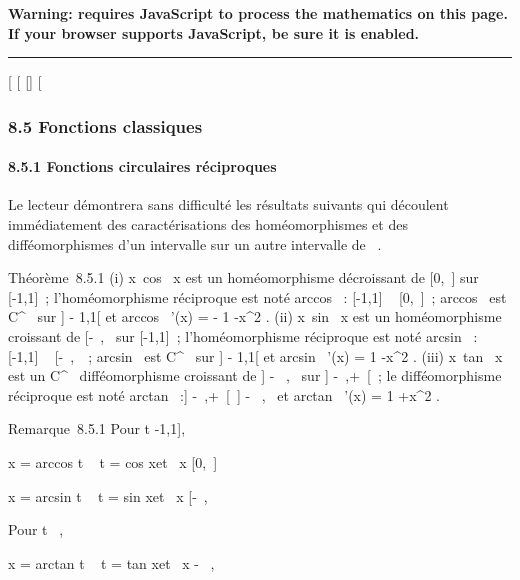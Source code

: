 \textbf{Warning: 
requires JavaScript to process the mathematics on this page.\\ If your
browser supports JavaScript, be sure it is enabled.}

\begin{center}\rule{3in}{0.4pt}\end{center}

{[}
{[}
{[}{]}
{[}

\subsubsection{8.5 Fonctions classiques}

\paragraph{8.5.1 Fonctions circulaires réciproques}

Le lecteur démontrera sans difficulté les résultats suivants qui
découlent immédiatement des caractérisations des homéomorphismes et des
difféomorphismes d'un intervalle sur un autre intervalle de ~.

Théorème~8.5.1 (i)
x\mapsto~cos~ x est un
homéomorphisme décroissant de {[}0,\pi~{]} sur {[}-1,1{]}~;
l'homéomorphisme réciproque est noté arccos~ :
{[}-1,1{]} \rightarrow~ {[}0,\pi~{]}~; arccos~ est
C^\infty~ sur {]} - 1,1{[} et arccos~ '(x)
= - 1 \over {}-x^2
. (ii) x\mapsto~sin~ x est
un homéomorphisme croissant de {[}-\pi~,\pi~\diagup2{]} sur {[}-1,1{]}~;
l'homéomorphisme réciproque est noté arcsin~ :
{[}-1,1{]} \rightarrow~ {[}-\pi~,\pi~\diagup2{]}~; arcsin~ est
C^\infty~ sur {]} - 1,1{[} et arcsin~ '(x)
= 1 \over {}-x^2 .
(iii) x\mapsto~tan~ x est
un C^\infty~ difféomorphisme croissant de {]} - \pi~,\pi~\diagup2{[} sur {]}
-\infty~,+\infty~{[}~; le difféomorphisme réciproque est noté
arctan~ :{]} -\infty~,+\infty~{[}\rightarrow~{]} - \pi~,\pi~\diagup2{[} et
arctan~ '(x) = 1 +x^2 .

Remarque~8.5.1 Pour t \in {[}-1,1{]},

x = arccos t \mathrel\Leftrightarrow~ t
= cos x\text et ~x \in
{[}0,\pi~{]}

x = arcsin t \mathrel\Leftrightarrow~ t
= sin x\text et ~x \in
{[}-\pi~,\pi~\diagup2{]}

Pour t \in {}~,

x = arctan t \mathrel\Leftrightarrow~ t
= tan x\text et ~x \in{]} -
\pi~,\pi~\diagup2{[}

